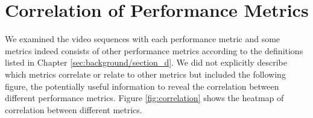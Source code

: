 \section{Correlation of Performance Metrics}
\label{sec:appendix/section_c}

We examined the video sequences with each performance metric and some metrics indeed consists of other performance metrics according to the definitions listed in Chapter \ref{sec:background/section_d}. We did not explicitly describe which metrics correlate or relate to other metrics but included the following figure, the potentially useful information to reveal the correlation between different performance metrics. Figure \ref{fig:correlation} shows the heatmap of correlation between different metrics.

